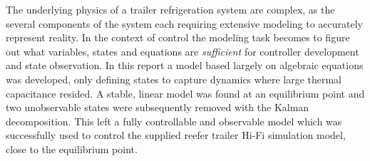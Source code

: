 





The underlying physics of a trailer refrigeration system are complex, as the several components of the system each requiring extensive modeling to accurately represent reality. In the context of control the modeling task becomes to figure out what variables, states and equations are \textit{sufficient} for controller development and state observation. In this report a model based largely on algebraic equations was developed, only defining states to capture dynamics where large thermal capacitance resided. A stable, linear model was found at an equilibrium point and two unobservable states were subsequently removed with the Kalman decomposition. This left a fully controllable and observable model which was successfully used to control the supplied reefer trailer Hi-Fi simulation model, close to the equilibrium point.\\

